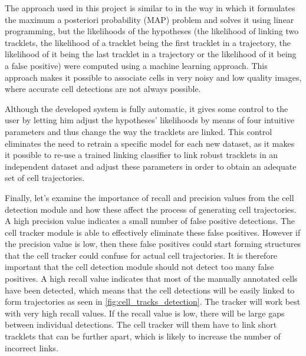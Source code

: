 		The approach used in this project is similar to \cite{bise11} in the way in which it formulates the maximum a posteriori probability (MAP) problem and solves it using linear programming, but the likelihoods of the hypotheses (the likelihood of linking two tracklets, the likelihood of a tracklet being the first tracklet in a trajectory, the likelihood of it being the last tracklet in a trajectory or the likelihood of it being a false positive) were computed using a machine learning approach. This approach makes it possible to associate cells in very noisy and low quality images, where accurate cell detections are not always possible.
		
		Although the developed system is fully automatic, it gives some control to the user by letting him adjust the hypotheses' likelihoods by means of four intuitive parameters and thus change the way the tracklets are linked. This control eliminates the need to retrain a specific model for each new dataset, as it makes it possible to re-use a trained linking classifier to link robust tracklets in an independent dataset and adjust these parameters in order to obtain an adequate set of cell trajectories.
		
		Finally, let's examine the importance of recall and precision values from the cell detection module and how these affect the process of generating cell trajectories. A high precision value indicates a small number of false positive detections. The cell tracker module is able to effectively eliminate these false positives. However if the precision value is low, then these false positives could start forming structures that the cell tracker could confuse for actual cell trajectories. It is therefore important that the cell detection module should not detect too many false positives. A high recall value indicates that most of the manually annotated cells have been detected, which means that the cell detections will be easily linked to form trajectories as seen in \cref{fig:cell_tracks_detection}. The tracker will work best with very high recall values. If the recall value is low, there will be large gaps between individual detections. The cell tracker will them have to link short tracklets that can be further apart, which is likely to increase the number of incorrect links.
				
